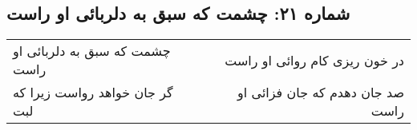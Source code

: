 \begin{center}
\section*{شماره ۲۱: چشمت که سبق به دلربائی او راست}
\label{sec:021}
\begin{longtable}{l p{0.5cm} r}
چشمت که سبق به دلربائی او راست
&&
در خون ریزی کام روائی او راست
\\
گر جان خواهد رواست زیرا که لبت
&&
صد جان دهدم که جان فزائی او راست
\\
\end{longtable}
\end{center}
